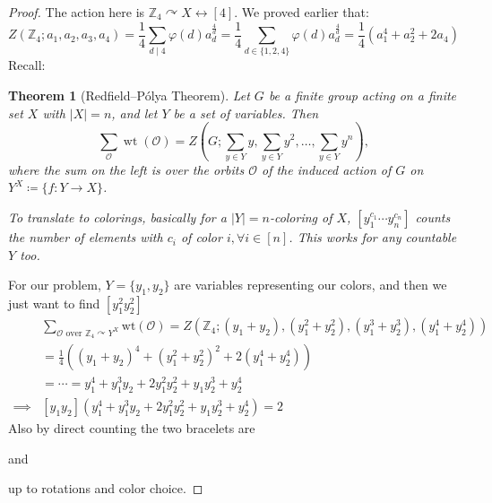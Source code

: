 \documentclass[addpoints,10pt]{exam}
\theoremstyle{plain}
\newcommand{\theoremname}{Theorem}
\newtheorem{thm}{\protect\theoremname}
\theoremstyle{definition}
\theoremstyle{plain}
\theoremstyle{plain}
\theoremstyle{definition}
\newcommand{\ZZ}{\ensuremath{\mathbb{Z}}}
\begin{document}
\begin{proof}
The action here is $\ZZ_{4}\curvearrowright X\longleftrightarrow[4]$. We proved earlier that: 
$$Z(\ZZ_{4};a_{1},a_{2},a_{3},a_{4})=\frac{1}{4}\sum_{d\mid 4}\varphi(d)a_{d}^{\frac{4}{d}}=\frac{1}{4}\sum_{d\in \{1,2,4\}}\varphi(d)a_{d}^{\frac{4}{d}}=\frac{1}{4}(a_{1}^{4}+a_{2}^{2}+2a_{4})$$
Recall: \begin{thm}[Redfield--Pólya Theorem]
Let $G$ be a finite group acting on a finite set $X$ with $|X|=n$, and let $Y$ be a set of variables. Then
\[
\sum_{\mathcal O}\operatorname{wt}(\mathcal O)
=
Z\!\left(
G;
\sum_{y\in Y}y,
\sum_{y\in Y}y^2,
\ldots,
\sum_{y\in Y}y^n
\right),
\]
where the sum on the left is over the orbits $\mathcal O$ of the induced action of $G$ on $Y^X\coloneq \{f:Y\to X\}$. 

To translate to colorings, basically for a $|Y|=n$-coloring of $X$, $[y_{1}^{c_{1}}\cdots y_{n}^{c_{n}}]$ counts the number of elements with $c_{i}$ of color $i,\forall i\in [n]$. This works for any countable $Y$ too.
\end{thm}

For our problem, $Y=\{y_{1},y_{2}\}$ are variables representing our colors, and then we just want to find $[y_{1}^{2}y_{2}^{2}]$
\begin{align*}
    &\sum_{\mathcal{O}\text{ over }\ZZ_{4}\curvearrowright Y^{X}}\mathrm{wt}(\mathcal{O})=Z(\ZZ_{4};(y_{1}+y_{2}),(y_{1}^{2}+y_{2}^{2}),(y_{1}^{3}+y_{2}^{3}),(y_{1}^{4}+y_{2}^{4}))\\
    &=\frac{1}{4}((y_{1}+y_{2})^{4} +(y_{1}^{2}+y_{2}^{2})^{2}+2(y_{1}^{4}+y_{2}^{4}))\\
    &=\cdots= y_1^4+y_1^3y_2+2y_1^2y_2^2+y_1y_2^3+y_2^4\\
    \implies &[y_{1}y_{2}](y_1^4+y_1^3y_2+2y_1^2y_2^2+y_1y_2^3+y_2^4)=2
\end{align*}
Also by direct counting the two bracelets are  and  up to rotations and color choice.

\end{proof}
\end{document}
